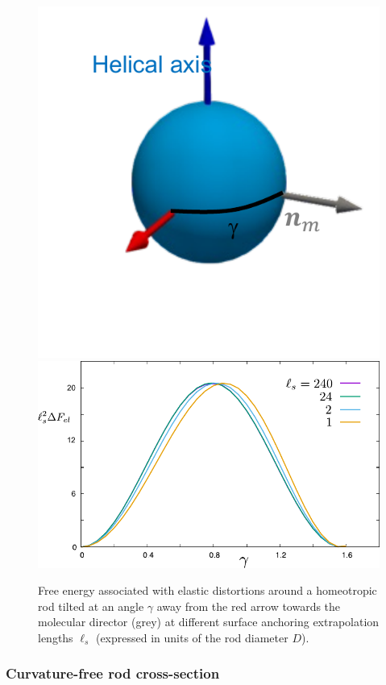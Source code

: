 \begin{figure}
	\includegraphics[width = .3\columnwidth]{figures/chapter-3/gamrods}
 \includegraphics[width = .6\columnwidth]{figures/chapter-3/fel}
	\caption[Free energy associated with elastic distortions around a homeotropic rod tilted at an angle $\gamma$]{Free energy associated with elastic distortions around a homeotropic rod tilted at an angle $\gamma$ away from the red arrow towards the molecular director (grey) at different surface anchoring extrapolation lengths $\ell_{s}$ (expressed in units of the rod diameter $D$).   }
	\label{fel}
\end{figure}




\subsubsection{Curvature-free rod cross-section}

